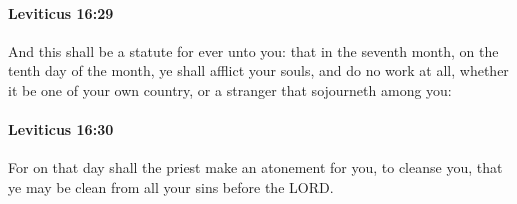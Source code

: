 		\paragraph{Leviticus 16:29} %
			\label{LEVITICUS-16-29}

			And this shall be a statute for ever unto you: that in the seventh month, on the tenth day of the month, ye shall afflict your souls, and do no work at all, whether it be one of your own country, or a stranger that sojourneth among you:


		\paragraph{Leviticus 16:30} %
			\label{LEVITICUS-16-30}

			For on that day shall the priest make an atonement for you, to cleanse you, that ye may be clean from all your sins before the LORD.

